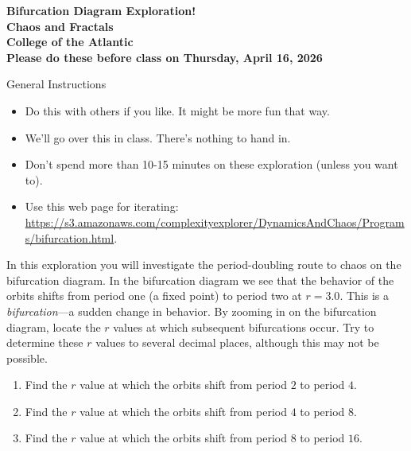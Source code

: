 \documentclass[12pt]{article}
\begin{document}
\pagestyle{empty}
 
\begin{center}
{\LARGE {\bf Bifurcation Diagram Exploration!}}\\
\bigskip
{\Large {\bf Chaos and Fractals}}\\
\bigskip
{\Large {\bf College of the Atlantic}}\\
\bigskip
    {{\bf Please do these before class on Thursday, April 16, 2026}}\\
\end{center}
\medskip

\noindent General Instructions

\begin{itemize}
\setlength{\itemsep}{0mm}
\item Do this with others if you like. It might be more fun that
  way.
\item We'll go over this in class. There's nothing to hand in. 
\item Don't spend more than 10-15 minutes on these exploration (unless
  you want to).
  \item Use this web page for iterating:
    \href{https://s3.amazonaws.com/complexityexplorer/DynamicsAndChaos/Programs/bifurcation.html}{\url{https://s3.amazonaws.com/complexityexplorer/DynamicsAndChaos/Programs/bifurcation.html}}.    
\end{itemize}


\noindent In this exploration you will investigate the period-doubling
route to chaos on the bifurcation diagram.  In the bifurcation diagram
we see that the behavior of the orbits shifts from period one (a fixed
point) to period two at $r=3.0$. This is a \emph{bifurcation}---a
sudden change in behavior.
By zooming in on the bifurcation diagram, locate
the $r$ values at which subsequent bifurcations occur. Try to determine
these $r$ values to several decimal places, although this may not be
possible.  

\begin{enumerate}

  \item Find the $r$ value at which the orbits shift from period $2$
    to period $4$.
  \item Find the $r$ value at which the orbits shift from period $4$
    to period $8$.
  \item Find the $r$ value at which the orbits shift from period $8$
    to period $16$.  
\end{enumerate}
\end{document}
